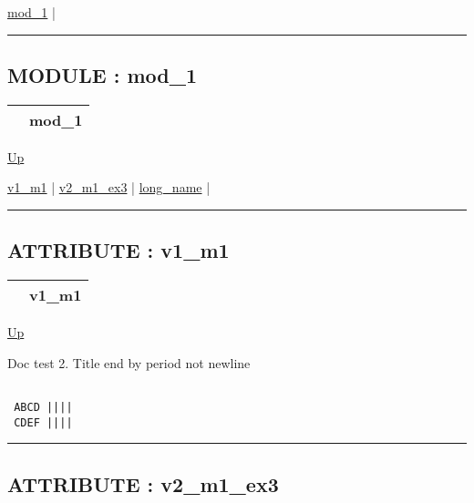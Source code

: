 \hyperlink{ecldoc:Example_3.mod_1}{mod\_1}  |

\rule{\textwidth}{0.4pt}

\subsection*{MODULE : mod\_1}
\hypertarget{ecldoc:Example_3.mod_1}{}

{\renewcommand{\arraystretch}{1.5}
\begin{tabularx}{\textwidth}{|>{\raggedright\arraybackslash}l|X|}
\hline
\hspace{0pt} & mod\_1 \\
\hline
\end{tabularx}
}

\hyperlink{ecldoc:Example_3}{Up}

\par


\hyperlink{ecldoc:example_3.mod_1.v1_m1}{v1\_m1}  |
\hyperlink{ecldoc:example_3.mod_1.v2_m1_ex3}{v2\_m1\_ex3}  |
\hyperlink{ecldoc:example_3.mod_1.long_name}{long\_name}  |

\rule{\textwidth}{0.4pt}

\subsection*{ATTRIBUTE : v1\_m1}
\hypertarget{ecldoc:example_3.mod_1.v1_m1}{}

{\renewcommand{\arraystretch}{1.5}
\begin{tabularx}{\textwidth}{|>{\raggedright\arraybackslash}l|X|}
\hline
\hspace{0pt} & v1\_m1 \\
\hline
\end{tabularx}
}

\hyperlink{ecldoc:Example_3.mod_1}{Up}

\par
Doc test 2. Title end by period not newline 
\begin{verbatim}

 ABCD ||||
 CDEF ||||\end{verbatim}




\rule{\textwidth}{0.4pt}
\subsection*{ATTRIBUTE : v2\_m1\_ex3}
\hypertarget{ecldoc:example_3.mod_1.v2_m1_ex3}{}

